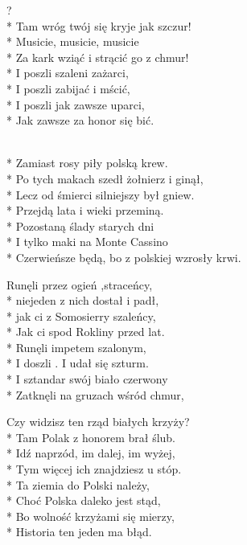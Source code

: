 \begin{lyrics}[longestline={Czerwieńsze będą, bo z polskiej wzrosły krwi.}]

?\\*
Tam wróg twój się kryje jak szczur!\\*
Musicie, musicie, musicie\\*
Za kark wziąć i strącić go z chmur!\\*
I poszli szaleni zażarci,\\*
I poszli zabijać i mścić,\\*
I poszli jak zawsze uparci,\\*
Jak zawsze za honor się bić.

\begin{chorus}
\\*
Zamiast rosy piły polską krew.\\*
Po tych makach szedł żołnierz i ginął,\\*
Lecz od śmierci silniejszy był gniew.\\*
Przejdą lata i wieki przeminą.\\*
Pozostaną ślady starych dni\\*
I tylko maki na Monte Cassino\\*
Czerwieńsze będą, bo z polskiej wzrosły krwi.
\end{chorus}

Runęli przez ogień ,straceńcy,\\*
niejeden z nich dostał i padł,\\*
jak ci z Somosierry szaleńcy,\\*
Jak ci spod Rokliny przed lat.\\*
Runęli impetem szalonym,\\*
I doszli . I udał się szturm.\\*
I sztandar swój biało czerwony\\*
Zatknęli na gruzach wśród chmur,

\chorusref

Czy widzisz ten rząd białych krzyży?\\*
Tam Polak z honorem brał ślub.\\*
Idź naprzód, im dalej, im wyżej,\\*
Tym więcej ich znajdziesz u stóp.\\*
Ta ziemia do Polski należy,\\*
Choć Polska daleko jest stąd,\\*
Bo wolność krzyżami się mierzy,\\*
Historia ten jeden ma błąd.

\chorusref
\end{lyrics}



